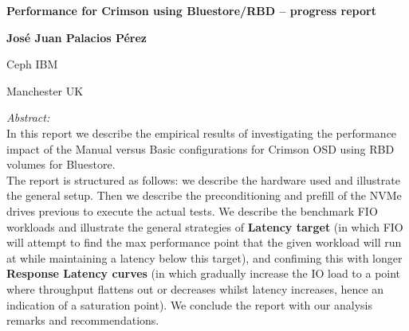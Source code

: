 \begin{titlepage}
   \begin{center}
       \vspace*{1cm}

       \Huge
       \textbf{Performance for Crimson using Bluestore/RBD -- progress report}

       \vspace{0.5cm}

       \textbf{Jos\'e Juan Palacios P\'erez}
       
       \vspace{0.5cm}
       
       Ceph IBM

       Manchester UK
       
       \vspace{1.5cm}
       \begin{minipage}[t]{0.6\textwidth}
                \begin{center} \large
                    \emph{Abstract:} \\ \bigskip\bigskip
                    In this report we describe the empirical results of investigating
                    the performance impact of the Manual versus Basic configurations for Crimson OSD
                    using RBD volumes for Bluestore.\\
                    The report is structured as follows: we describe the hardware used and illustrate the
                    general setup. Then we describe the preconditioning and prefill of the NVMe drives previous
                    to execute the actual tests. We describe the benchmark FIO workloads and illustrate
                    the general strategies of \textbf{Latency target} (in which FIO will attempt to find
                    the max performance point that the given workload will run at while maintaining a
                    latency below this target), and confiming this with longer \textbf{Response Latency curves}
                    (in which gradually increase the IO load to a point where throughput flattens out
                    or decreases whilst latency increases, hence an indication of a saturation point).
                    We conclude the report with our analysis remarks and recommendations.
                \end{center}
            \end{minipage}\\[3cm]
       

\end{center}
\end{titlepage}
